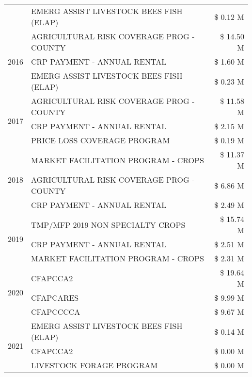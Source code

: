\begin{tabular}{llr}
 & EMERG ASSIST LIVESTOCK BEES FISH (ELAP) & \$ 0.12 M \\
\cline{1-3}
\multirow[t]{3}{*}{2016} & AGRICULTURAL RISK COVERAGE PROG - COUNTY & \$ 14.50 M \\
 & CRP PAYMENT - ANNUAL RENTAL & \$ 1.60 M \\
 & EMERG ASSIST LIVESTOCK BEES FISH (ELAP) & \$ 0.23 M \\
\cline{1-3}
\multirow[t]{3}{*}{2017} & AGRICULTURAL RISK COVERAGE PROG - COUNTY & \$ 11.58 M \\
 & CRP PAYMENT - ANNUAL RENTAL & \$ 2.15 M \\
 & PRICE LOSS COVERAGE PROGRAM & \$ 0.19 M \\
\cline{1-3}
\multirow[t]{3}{*}{2018} & MARKET FACILITATION PROGRAM - CROPS & \$ 11.37 M \\
 & AGRICULTURAL RISK COVERAGE PROG - COUNTY & \$ 6.86 M \\
 & CRP PAYMENT - ANNUAL RENTAL & \$ 2.49 M \\
\cline{1-3}
\multirow[t]{3}{*}{2019} & TMP/MFP 2019 NON SPECIALTY CROPS & \$ 15.74 M \\
 & CRP PAYMENT - ANNUAL RENTAL & \$ 2.51 M \\
 & MARKET FACILITATION PROGRAM - CROPS & \$ 2.31 M \\
\cline{1-3}
\multirow[t]{3}{*}{2020} & CFAPCCA2 & \$ 19.64 M \\
 & CFAPCARES & \$ 9.99 M \\
 & CFAPCCCCA & \$ 9.67 M \\
\cline{1-3}
\multirow[t]{3}{*}{2021} & EMERG ASSIST LIVESTOCK BEES FISH (ELAP) & \$ 0.14 M \\
 & CFAPCCA2 & \$ 0.00 M \\
 & LIVESTOCK FORAGE PROGRAM & \$ 0.00 M \\
\cline{1-3}
\bottomrule
\end{tabular}
